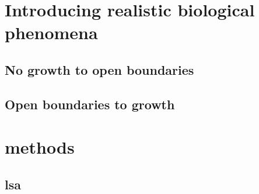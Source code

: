 
\section{Introducing realistic biological phenomena}
\subsection{No growth to open boundaries}
\subsection{Open boundaries to growth}


\section{methods}
\subsection{lsa}

